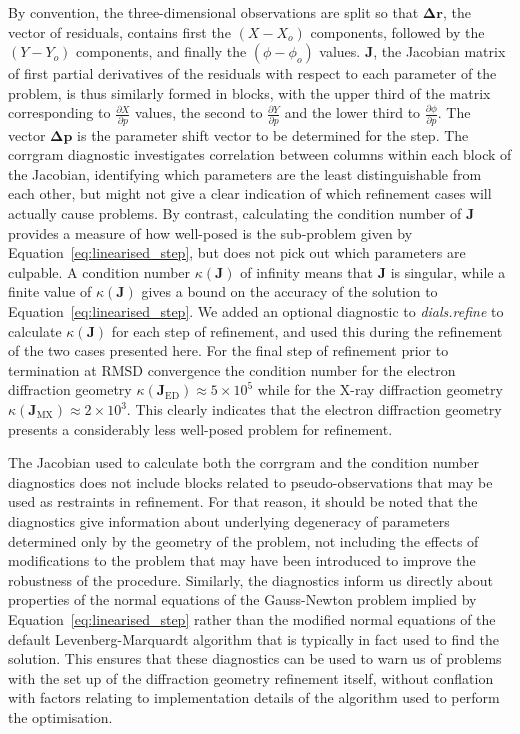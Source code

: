 \documentclass[preprint]{iucr}
\newcommand{\dialsrefine}{\emph{dials.refine}\xspace}
\renewcommand{\vec}[1]{\mathbf{#1}}
\newcommand{\mat}[1]{\mathbf{#1}}
\newcommand{\pder}[2][]{\frac{\partial#1}{\partial#2}}
\begin{document}
By convention, the three-dimensional observations are split so that
$\vec{\Delta r}$, the vector of residuals, contains first the $(X - X_o)$
components, followed by the $(Y - Y_o)$ components, and finally the $(\phi -
\phi_o)$ values. $\mat{J}$, the Jacobian matrix of first partial derivatives of
the residuals with respect to each parameter of the problem, is thus similarly
formed in blocks, with the upper third of the matrix corresponding to
$\pder[X]{p}$ values, the second to $\pder[Y]{p}$ and the lower third to
$\pder[\phi]{p}$. The vector $\vec{\Delta p}$ is the parameter shift vector to
be determined for the step. The corrgram diagnostic investigates correlation
between columns within each block of the Jacobian, identifying which parameters
are the least distinguishable from each other, but might not give a clear
indication of which refinement cases will actually cause problems. By contrast,
calculating the condition number of $\mat{J}$ provides a measure of how
well-posed is the sub-problem given by Equation~\ref{eq:linearised_step}, but
does not pick out which parameters are culpable. A condition number $\kappa
\left( \mat{J} \right)$ of infinity means that $\mat{J}$ is singular, while a
finite value of $\kappa \left( \mat{J} \right)$ gives a bound on the accuracy
of the solution to Equation~\ref{eq:linearised_step}. We added an optional
diagnostic to \dialsrefine to calculate $\kappa \left( \mat{J} \right)$ for
each step of refinement, and used this during the refinement of the two cases
presented here. For the final step of refinement prior to termination at RMSD
convergence the condition number for the electron diffraction geometry $\kappa
\left( \mat{J}_{\textrm{ED}} \right) \approx 5 \times 10^5$ while for the X-ray
diffraction geometry $\kappa \left( \mat{J}_{\textrm{MX}} \right) \approx 2
\times 10^3$. This clearly indicates that the electron diffraction geometry
presents a considerably less well-posed problem for refinement.

The Jacobian used to calculate both the corrgram and the condition number
diagnostics does not include blocks related to pseudo-observations that may be
used as restraints in refinement. For that reason, it should be noted that the
diagnostics give information about underlying degeneracy of parameters
determined only by the geometry of the problem, not including the effects of
modifications to the problem that may have been introduced to improve the
robustness of the procedure. Similarly, the diagnostics inform us directly
about properties of the normal equations of the Gauss-Newton problem implied by
Equation~\ref{eq:linearised_step} rather than the modified normal equations of
the default Levenberg-Marquardt algorithm that is typically in fact used to
find the solution. This ensures that these diagnostics can be used to warn us
of problems with the set up of the diffraction geometry refinement itself,
without conflation with factors relating to implementation details of the
algorithm used to perform the optimisation.
\end{document}
